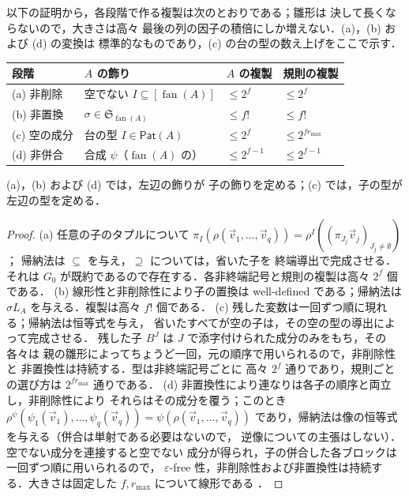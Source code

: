 \documentclass[11pt,a4paper]{ltjsarticle}
\numberwithin{equation}{section}
\theoremstyle{plain}
\theoremstyle{definition}
\theoremstyle{remark}
\newcommand{\tuple}[1]{\vec{#1}}
\newcommand{\eps}{\varepsilon}
\newcommand{\fan}{\operatorname{fan}}
\theoremstyle{plain}
\begin{document}
以下の証明から，各段階で作る複製は次のとおりである；雛形は
決して長くならないので，大きさは高々
最後の列の因子の積倍にしか増えない．(a)，(b) および (d) の変換は
標準的なものであり，(c) の台の型の数え上げをここで示す．
\begin{center}
\footnotesize
\setlength{\tabcolsep}{4pt}
\renewcommand{\arraystretch}{1.15}
\begin{tabular}{@{}llll@{}}
\hline
段階 & $A$ の飾り & $A$ の複製 & 規則の複製\\
\hline
(a) 非削除 & 空でない $I\subseteq[\fan(A)]$ & $\le2^f$ & $\le2^f$\\
(b) 非置換 & $\sigma\in\mathfrak S_{\fan(A)}$ & $\le f!$ & $\le f!$\\
(c) 空の成分 & 台の型 $I\in\mathsf{Pat}(A)$ & $\le2^f$ & $\le2^{fr_{\max}}$\\
(d) 非併合 & 合成 $\psi$（$\fan(A)$ の） & $\le2^{f-1}$ & $\le2^{f-1}$\\
\hline
\end{tabular}
\end{center}
(a)，(b) および (d) では，左辺の飾りが
子の飾りを定める；(c) では，子の型が左辺の型を定める．

\begin{proof}
(a) 任意の子のタプルについて
$\pi_I(\rho(\tuple v_1,\ldots,\tuple v_q))=\rho^I((\pi_{J_j}\tuple v_j)_{J_j\ne\emptyset})$；
帰納法は $\subseteq$ を与え，$\supseteq$ については，省いた子を
終端導出で完成させる．それは $G_0$ が既約であるので存在する．各非終端記号と規則の複製は高々 $2^f$
個である．
(b) 線形性と非削除性により子の置換は well-defined である；帰納法は
$\sigma L_A$ を与える．複製は高々 $f!$ 個である．
(c) 残した変数は一回ずつ順に現れる；帰納法は恒等式を与え，
省いたすべてが空の子は，その空の型の導出によって完成させる．
残した子 $B^J$ は $J$ で添字付けられた成分のみをもち，その各々は
親の雛形によってちょうど一回，元の順序で用いられるので，非削除性と
非置換性は持続する．型は非終端記号ごとに
高々 $2^f$ 通りであり，規則ごとの選び方は $2^{fr_{\max}}$ 通りである．
(d) 非置換性により連なりは各子の順序と両立し，非削除性により
それらはその成分を覆う；このとき
$\rho^\psi(\psi_1(\tuple v_1),\ldots,\psi_q(\tuple v_q))=\psi(\rho(\tuple v_1,\ldots,\tuple v_q))$
であり，帰納法は像の恒等式を与える（併合は単射である必要はないので，
逆像についての主張はしない）．空でない成分を連接すると空でない
成分が得られ，子の併合した各ブロックは一回ずつ順に用いられるので，
$\eps$-free 性，非削除性および非置換性は持続する．大きさは固定した $f,r_{\max}$ について線形である
\cite{Yoshinaka2011}．
\end{proof}
\end{document}

